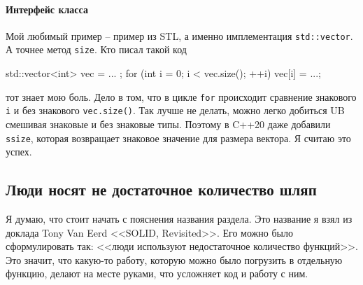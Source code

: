 \paragraph{Интерфейс класса}

Мой любимый пример -- пример из STL, а именно имплементация \verb"std::vector".
А точнее метод \verb"size".
Кто писал такой код
\begin{cppcode}
std::vector<int> vec = { ... };
for (int i = 0; i < vec.size(); ++i)
  vec[i] = ...;
\end{cppcode}
тот знает мою боль.
Дело в том, что в цикле \verb"for" происходит сравнение знакового \verb"i" и без знакового \verb"vec.size()".
Так лучше не делать, можно легко добиться UB смешивая знаковые и без знаковые типы.
Поэтому в C++20 даже добавили \verb"ssize", которая возвращает знаковое значение для размера вектора.
Я считаю это успех.

\subsection{Люди носят не достаточное количество шляп}
\label{section::NotEnoughHats}

Я думаю, что стоит начать с пояснения названия раздела.
Это название я взял из доклада Tony Van Eerd <<SOLID, Revisited>>.
Его можно было сформулировать так: <<люди используют недостаточное количество функций>>.
Это значит, что какую-то работу, которую можно было погрузить в отдельную функцию, делают на месте руками, что усложняет код и работу с ним.



